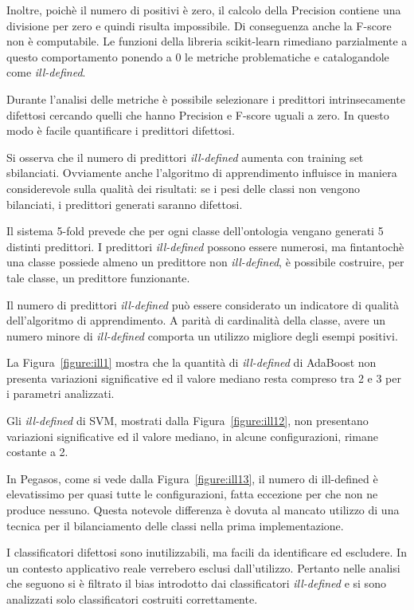 \documentclass[12pt,a4paper,oneside,hidelinks]{report}
\begin{document}
Inoltre, poichè il numero di positivi è zero, il calcolo della Precision contiene una divisione per zero e quindi  risulta impossibile. Di conseguenza anche la F-score non è computabile. Le funzioni della libreria scikit-learn rimediano parzialmente a questo comportamento ponendo a 0 le metriche problematiche e catalogandole come \emph{ill-defined}.

Durante l'analisi delle metriche è possibile selezionare i predittori intrinsecamente difettosi cercando quelli che hanno Precision e F-score uguali a zero. In questo modo è facile quantificare i predittori difettosi.

Si osserva che il numero di predittori \emph{ill-defined} aumenta con training set sbilanciati. Ovviamente anche l'algoritmo di apprendimento influisce in maniera considerevole sulla qualità dei risultati: se i pesi delle classi non vengono bilanciati, i predittori generati saranno difettosi.

Il sistema 5-fold prevede che per ogni classe dell'ontologia vengano generati 5 distinti predittori. I predittori \emph{ill-defined} possono essere numerosi, ma fintantochè una classe possiede almeno un predittore non \emph{ill-defined}, è possibile costruire, per tale classe, un predittore funzionante.

Il numero di predittori \emph{ill-defined} può essere considerato un indicatore di qualità dell'algoritmo di apprendimento. A parità di cardinalità della classe, avere un numero minore di \emph{ill-defined} comporta un utilizzo migliore degli esempi positivi.

La Figura~\ref{figure:ill1} mostra che la quantità di \emph{ill-defined} di AdaBoost non presenta variazioni significative ed il valore mediano resta compreso tra 2 e 3 per i parametri analizzati.

Gli \emph{ill-defined} di SVM, mostrati dalla Figura~\ref{figure:ill12}, non presentano variazioni significative ed il valore mediano, in alcune configurazioni, rimane costante a 2.

In Pegasos, come si vede dalla Figura~\ref{figure:ill13}, il numero di ill-defined è elevatissimo per quasi tutte le configurazioni, fatta eccezione per  che non ne produce nessuno. Questa notevole differenza è dovuta al mancato utilizzo di una tecnica per il bilanciamento delle classi nella prima implementazione.

I classificatori difettosi sono inutilizzabili, ma facili da identificare ed escludere. In un contesto applicativo reale verrebero esclusi dall'utilizzo. Pertanto nelle analisi che seguono si è filtrato il bias introdotto dai classificatori \emph{ill-defined} e si sono analizzati solo classificatori costruiti correttamente.
\end{document}
